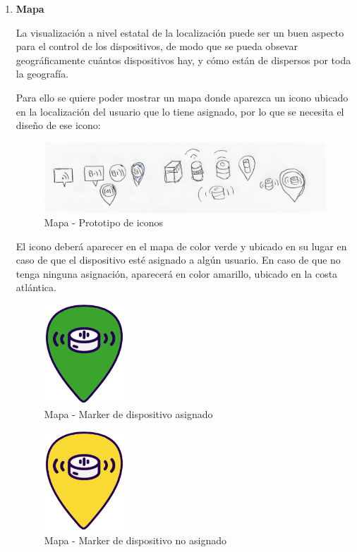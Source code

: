 \begin{enumerate}
    \item \textbf{Mapa} %
    
    La visualización a nivel estatal de la localización puede ser un buen aspecto para el control de los dispositivos, de modo que se pueda obsevar geográficamente cuántos dispositivos hay, y cómo están de dispersos por toda la geografía.
    
    Para ello se quiere poder mostrar un mapa donde aparezca un icono ubicado en la localización del usuario que lo tiene asignado, por lo que se necesita el diseño de ese icono:

    \begin{figure}[H]   
        \centering
        \includegraphics[width=13cm]{./img/icon/maps.icons.png}
        \caption{Mapa - Prototipo de iconos}
        \label{fig:icon.pre}
    \end{figure}

    El icono deberá aparecer en el mapa de color verde y ubicado en su lugar en caso de que el dispositivo esté asignado a algún usuario. En caso de que no tenga ninguna asignación, aparecerá en color amarillo, ubicado en la costa atlántica.
    
    \begin{figure}[H]   
        \centering
        \includegraphics[width=3cm]{./img/icon/marker-green.png}
        \caption{Mapa - Marker de dispositivo asignado}
        \label{fig:icon.green}
    \end{figure}
    
    \begin{figure}[H]   
        \centering
        \includegraphics[width=3cm]{./img/icon/marker-yellow.png}
        \caption{Mapa - Marker de dispositivo no asignado}
        \label{fig:icon.yellow}
    \end{figure}
    

\end{enumerate}

